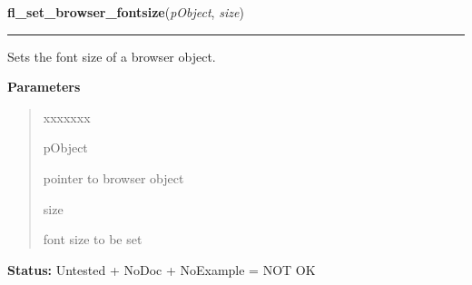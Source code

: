 \hspace{.8\funcindent}\begin{boxedminipage}{\funcwidth}

    \raggedright \textbf{fl\_set\_browser\_fontsize}(\textit{pObject}, \textit{size})

    \vspace{-1.5ex}

    \rule{\textwidth}{0.5\fboxrule}
\setlength{\parskip}{2ex}
    Sets the font size of a browser object.

\setlength{\parskip}{1ex}
      \textbf{Parameters}
      \vspace{-1ex}

      \begin{quote}
        \begin{Ventry}{xxxxxxx}

          \item[pObject]

          pointer to browser object

          \item[size]

          font size to be set

        \end{Ventry}

      \end{quote}

\textbf{Status:} Untested + NoDoc + NoExample = NOT OK



    \end{boxedminipage}

    \label{xformslib:library:fl_set_browser_fontstyle}

    \vspace{0.5ex}

